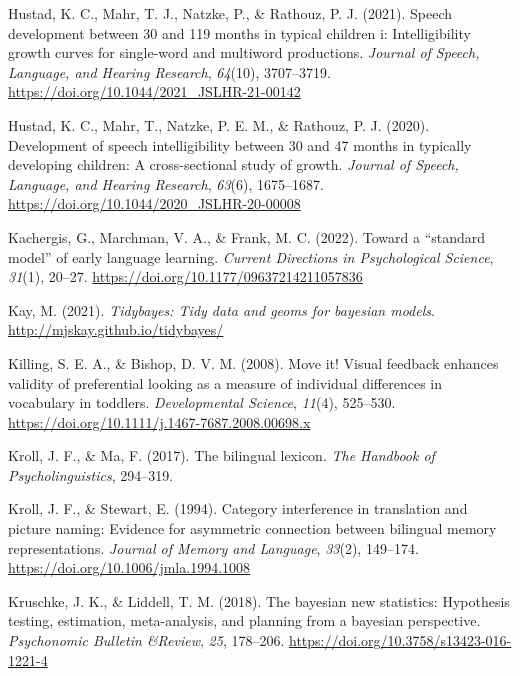 \documentclass[
]{article}
\newlength{\cslhangindent}
\newlength{\cslentryspacingunit} %
\newenvironment{CSLReferences}[2] %
 {%
  \setlength{\parindent}{0pt}
  \ifodd #1
  \let\oldpar\par
  \def\par{\hangindent=\cslhangindent\oldpar}
  \fi
  \setlength{\parskip}{#2\cslentryspacingunit}
 }%
 {}
\begin{document}
\begin{CSLReferences}{1}{0}
\leavevmode{}%
Hustad, K. C., Mahr, T. J., Natzke, P., \& Rathouz, P. J. (2021). Speech
development between 30 and 119 months in typical children i:
Intelligibility growth curves for single-word and multiword productions.
\emph{Journal of Speech, Language, and Hearing Research}, \emph{64}(10),
3707--3719. \url{https://doi.org/10.1044/2021_JSLHR-21-00142}

\leavevmode{}%
Hustad, K. C., Mahr, T., Natzke, P. E. M., \& Rathouz, P. J. (2020).
Development of speech intelligibility between 30 and 47 months in
typically developing children: A cross-sectional study of growth.
\emph{Journal of Speech, Language, and Hearing Research}, \emph{63}(6),
1675--1687. \url{https://doi.org/10.1044/2020_JSLHR-20-00008}

\leavevmode{}%
Kachergis, G., Marchman, V. A., \& Frank, M. C. (2022). Toward a
{``standard model''} of early language learning. \emph{Current
Directions in Psychological Science}, \emph{31}(1), 20--27.
\url{https://doi.org/10.1177/09637214211057836}

\leavevmode{}%
Kay, M. (2021). \emph{Tidybayes: Tidy data and geoms for bayesian
models}. \url{http://mjskay.github.io/tidybayes/}

\leavevmode{}%
Killing, S. E. A., \& Bishop, D. V. M. (2008). Move it! Visual feedback
enhances validity of preferential looking as a measure of individual
differences in vocabulary in toddlers. \emph{Developmental Science},
\emph{11}(4), 525--530.
\url{https://doi.org/10.1111/j.1467-7687.2008.00698.x}

\leavevmode{}%
Kroll, J. F., \& Ma, F. (2017). The bilingual lexicon. \emph{The
Handbook of Psycholinguistics}, 294--319.

\leavevmode{}%
Kroll, J. F., \& Stewart, E. (1994). Category interference in
translation and picture naming: Evidence for asymmetric connection
between bilingual memory representations. \emph{Journal of Memory and
Language}, \emph{33}(2), 149--174.
\url{https://doi.org/10.1006/jmla.1994.1008}

\leavevmode{}%
Kruschke, J. K., \& Liddell, T. M. (2018). The bayesian new statistics:
Hypothesis testing, estimation, meta-analysis, and planning from a
bayesian perspective. \emph{Psychonomic Bulletin \&Review}, \emph{25},
178--206. \url{https://doi.org/10.3758/s13423-016-1221-4}


\end{CSLReferences}
\end{document}
